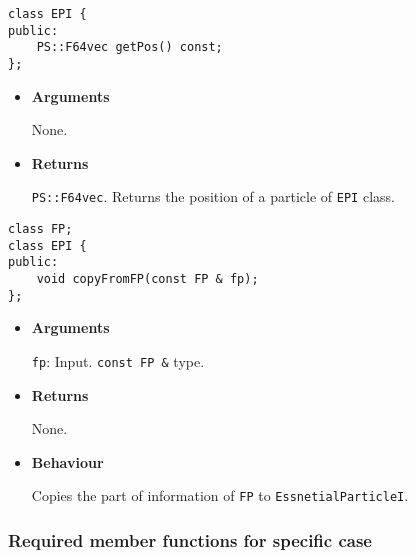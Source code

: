 
\begin{screen}
\begin{verbatim}
class EPI {
public:
    PS::F64vec getPos() const;
};
\end{verbatim}
\end{screen}

\begin{itemize}

\item {\bf Arguments}

  None.
  
\item {\bf Returns}

  \texttt{PS::F64vec}.
  Returns the position of a particle of \texttt{EPI} class.

\end{itemize}


\begin{screen}
\begin{verbatim}
class FP;
class EPI {
public:
    void copyFromFP(const FP & fp);
};
\end{verbatim}
\end{screen}

\begin{itemize}

\item {\bf Arguments}

  \texttt{fp}: Input. \texttt{const FP \&} type.

\item {\bf Returns}

  None.
  
\item {\bf Behaviour}

  Copies the part of information of \texttt{FP} to \texttt{EssnetialParticleI}.
  
\end{itemize}

\subsubsection{Required member functions for specific case}


